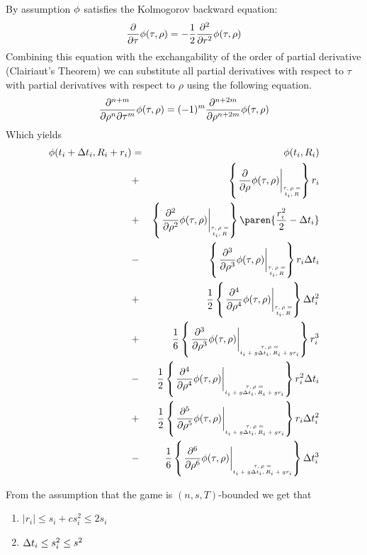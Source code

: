 \documentclass{article}[12pt]
\begin{document}
By assumption $\phi$ satisfies the Kolmogorov backward equation:
\begin{equation*} 
  \frac{\partial}{\partial \tau} \phi(\tau,\rho)
  = -\frac{1}{2} \frac{\partial^2}{\partial r^2} \phi(\tau,\rho)
\end{equation*}
Combining this equation with the exchangability of the order of
partial derivative (Clairiaut's Theorem) we can substitute all
partial derivatives with respect to $\tau$ with partial derivatives
with respect to $\rho$ using the following equation.
\[
  \frac{\partial^{n+m}}{\partial \rho^n \partial \tau^m} \phi(\tau,\rho)=
  (-1)^m \frac{\partial^{n+2m}}{\partial \rho^{n+2m}} \phi(\tau,\rho)
\]
Which yields
\begin{eqnarray}
      \pot(t_i+\deltat_i,\R_i+r_i) & =&  
    \pot(t_i,\R_i)\\
    &+& \at{\frac{\partial}{\partial \rho}} r_i \label{term:coll1}\\
    &+& \at{\frac{\partial^2}{\partial \rho^2}} \paren{\frac{r_i^2}{2}-\deltat_i} \label{term:coll2}\\
    &-& \at{\frac{\partial^3}{\partial \rho^3}} r_i \deltat_i \label{term:coll3}\\
    &+& \frac{1}{2} \at{\frac{\partial^4}{\partial \rho^4}} \deltat_i^2 \label{term:coll4}\\
    &+& \frac{1}{6} \att{\frac{\partial^3}{\partial \rho^3}} r_i^3 \label{term:coll5}\\
    &-& \frac{1}{2} \att{\frac{\partial^4}{\partial \rho^4}} r_i^2\deltat_i \label{term:coll6}\\
    &+& \frac{1}{2} \att{\frac{\partial^5}{\partial \rho^5}} r_i\deltat_i^2 \label{term:coll7}\\
    &-& \frac{1}{6} \att{\frac{\partial^6}{\partial \rho^6}} \deltat_i^3 \label{term:coll8}
\end{eqnarray}

  From the assumption that the game is $(n,s,T)$-bounded we get that 
  \begin{enumerate}
  \item $|r_i| \leq s_i +c s_i^2 \leq 2 s_i$
  \item $\Delta t_i \leq s_i^2 \leq s^2$
  \end{enumerate}
\end{document}
